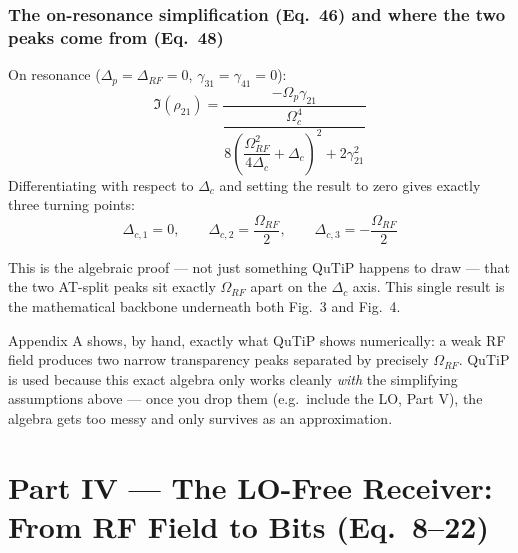 \documentclass[11pt]{article}
\begin{document}
\subsubsection*{The on-resonance simplification (Eq.~46) and where the two peaks come from (Eq.~48)}
On resonance ($\Delta_p=\Delta_{RF}=0$, $\gamma_{31}=\gamma_{41}=0$):
\[
\Im(\rho_{21}) = \frac{-\Omega_p\gamma_{21}}{\dfrac{\Omega_c^4}{8\left(\dfrac{\Omega_{RF}^2}{4\Delta_c}+\Delta_c\right)^2 + 2\gamma_{21}^2}}
\]
Differentiating with respect to $\Delta_c$ and setting the result to zero gives exactly three turning points:
\[
\Delta_{c,1}=0,\qquad \Delta_{c,2}=\frac{\Omega_{RF}}{2},\qquad \Delta_{c,3}=-\frac{\Omega_{RF}}{2}
\]
\begin{eqmeaning}
This is the algebraic proof --- not just something QuTiP happens to draw --- that the two AT-split peaks sit exactly $\Omega_{RF}$ apart on the $\Delta_c$ axis. This single result is the mathematical backbone underneath both Fig.~3 and Fig.~4.
\end{eqmeaning}
\begin{takeaway}
Appendix A shows, by hand, exactly what QuTiP shows numerically: a weak RF field produces two narrow transparency peaks separated by precisely $\Omega_{RF}$. QuTiP is used because this exact algebra only works cleanly \emph{with} the simplifying assumptions above --- once you drop them (e.g.\ include the LO, Part V), the algebra gets too messy and only survives as an approximation.
\end{takeaway}

\newpage
\section{Part IV --- The LO-Free Receiver: From RF Field to Bits (Eq.~8--22)}

\begin{center}
\end{center}
\end{document}
